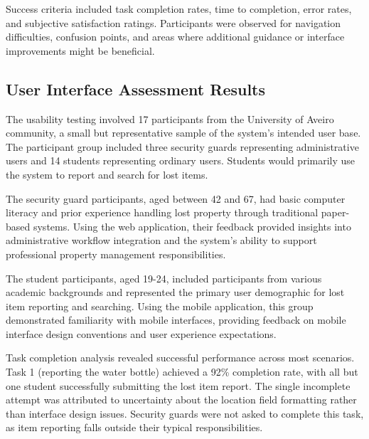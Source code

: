 Success criteria included task completion rates, time to completion, error rates, and subjective satisfaction ratings. Participants were observed for navigation difficulties, confusion points, and areas where additional guidance or interface improvements might be beneficial.

\subsection{User Interface Assessment Results} \label{subsection:ui_assessment}

The usability testing involved 17 participants from the University of Aveiro community, a small but representative sample of the system's intended user base. The participant group included three security guards representing administrative users and 14 students representing ordinary users. Students would primarily use the system to report and search for lost items.


The security guard participants, aged between 42 and 67, had basic computer literacy and prior experience handling lost property through traditional paper-based systems. Using the web application, their feedback provided insights into administrative workflow integration and the system's ability to support professional property management responsibilities.

The student participants, aged 19-24, included participants from various academic backgrounds and represented the primary user demographic for lost item reporting and searching. Using the mobile application, this group demonstrated familiarity with mobile interfaces, providing feedback on mobile interface design conventions and user experience expectations.

Task completion analysis revealed successful performance across most scenarios. Task 1 (reporting the water bottle) achieved a 92\% completion rate, with all but one student successfully submitting the lost item report. The single incomplete attempt was attributed to uncertainty about the location field formatting rather than interface design issues. Security guards were not asked to complete this task, as item reporting falls outside their typical responsibilities.


